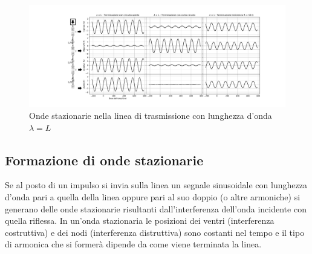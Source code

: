 \documentclass[journal]{IEEEtran}
\begin{document}
\begin{figure}[h]%
\includegraphics[trim = {200pt 0 0 0}, clip, width=1.1\textwidth]{analysis/output/Delay_line_lambdaL.pdf}
\caption{Onde stazionarie nella linea di trasmissione con lunghezza d'onda $\lambda = L$}
\label{fig: delayline L}
\end{figure}


\subsection{Formazione di onde stazionarie}

Se al posto di un impulso si invia sulla linea un segnale sinusoidale con lunghezza d'onda pari a quella della linea oppure pari al suo doppio (o altre armoniche) si generano delle onde stazionarie risultanti dall'interferenza dell'onda incidente con quella riflessa. 
In un'onda stazionaria le posizioni dei ventri (interferenza costruttiva) e dei nodi (interferenza distruttiva) sono costanti nel tempo e il tipo di armonica che si formerà dipende da come viene terminata la linea.
\end{document}
